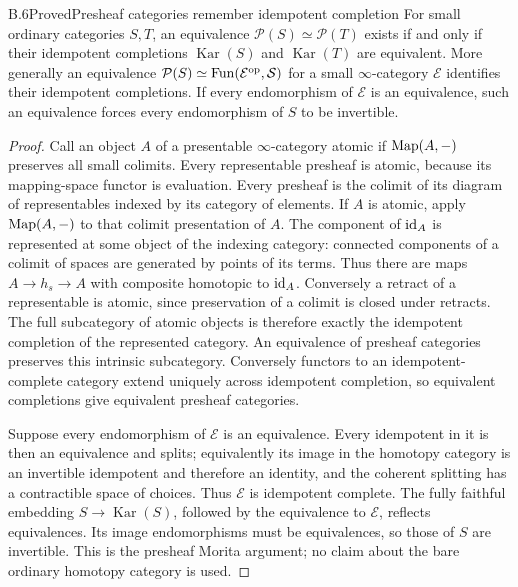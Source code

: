 \begin{statement}{B.6}{Proved}{Presheaf categories remember idempotent completion}
For small ordinary categories $S,T$, an equivalence
$\mathcal P(S)\simeq\mathcal P(T)$ exists if and only if their idempotent
completions $\operatorname{Kar}(S)$ and $\operatorname{Kar}(T)$ are
equivalent. More generally an equivalence
$\mathcal P(S)\simeq\operatorname{Fun}(\mathcal E^{\mathrm{op}},\mathcal S)$ for a small
$\infty$-category $\mathcal E$ identifies their idempotent completions.
If every endomorphism of $\mathcal E$ is an equivalence, such an
equivalence forces every endomorphism of $S$ to be invertible.
\end{statement}
\begin{proof}
Call an object $A$ of a presentable $\infty$-category atomic if
$\operatorname{Map}(A,-)$ preserves all small colimits. Every representable presheaf
is atomic, because its mapping-space functor is evaluation. Every
presheaf is the colimit of its diagram of representables indexed by its
category of elements. If $A$ is atomic, apply $\operatorname{Map}(A,-)$ to that
colimit presentation of $A$. The component of $\mathrm{id}_A$ is represented
at some object of the indexing category: connected components of a
colimit of spaces are generated by points of its terms. Thus there are
maps $A\to h_s\to A$ with composite homotopic to $\mathrm{id}_A$. Conversely a
retract of a representable is atomic, since preservation of a colimit
is closed under retracts. The full subcategory of atomic objects is
therefore exactly the idempotent completion of the represented category.
An equivalence of presheaf categories preserves this intrinsic
subcategory. Conversely functors to an idempotent-complete category
extend uniquely across idempotent completion, so equivalent completions
give equivalent presheaf categories.

Suppose every endomorphism of $\mathcal E$ is an equivalence. Every
idempotent in it is then an equivalence and splits; equivalently its
image in the homotopy category is an invertible idempotent and therefore
an identity, and the coherent splitting has a contractible space of
choices. Thus $\mathcal E$ is idempotent complete. The fully faithful
embedding $S\to\operatorname{Kar}(S)$, followed by the equivalence to
$\mathcal E$, reflects equivalences. Its image endomorphisms must be
equivalences, so those of $S$ are invertible. This is the presheaf Morita
argument; no claim about the bare ordinary homotopy category is used.
\end{proof}

